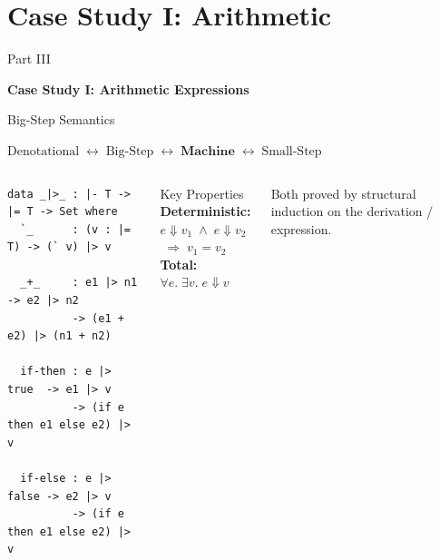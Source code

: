 \documentclass[10pt,compress,aspectratio=169]{beamer}
\newcommand{\chainhere}[1]{%
  \begin{center}\small
  $\text{Denotational}
  \;\leftrightarrow\;
  \text{Big-Step}
  \;\leftrightarrow\;
  \mathbf{#1}
  \;\leftrightarrow\;
  \text{Small-Step}$
  \end{center}}
\begin{document}
\section{Case Study I: Arithmetic}

\begin{frame}{}
  \centering\vfill
  {Part III\par}
  \bigskip
  {\Large\bfseries Case Study I: Arithmetic Expressions}
  \vfill
\end{frame}

\begin{frame}[fragile]{Big-Step Semantics}
  \chainhere{Machine}
  \begin{columns}[T]
      \begin{verbatim}
data _|>_ : |- T -> |= T -> Set where
  `_      : (v : |= T) -> (` v) |> v

  _+_     : e1 |> n1 -> e2 |> n2
          -> (e1 + e2) |> (n1 + n2)

  if-then : e |> true  -> e1 |> v
          -> (if e then e1 else e2) |> v

  if-else : e |> false -> e2 |> v
          -> (if e then e1 else e2) |> v
      \end{verbatim}
      \begin{block}{Key Properties}
        \textbf{Deterministic:}\\[3pt]
        $e \Downarrow v_1 \;\land\; e \Downarrow v_2$\\[2pt]
        $\;\Rightarrow\; v_1 = v_2$\\[8pt]
        \textbf{Total:}\\[3pt]
        $\forall e.\; \exists v.\; e \Downarrow v$
      \end{block}
      \bigskip
      Both proved by structural induction on the derivation / expression.
  \end{columns}
\end{frame}
\end{document}
